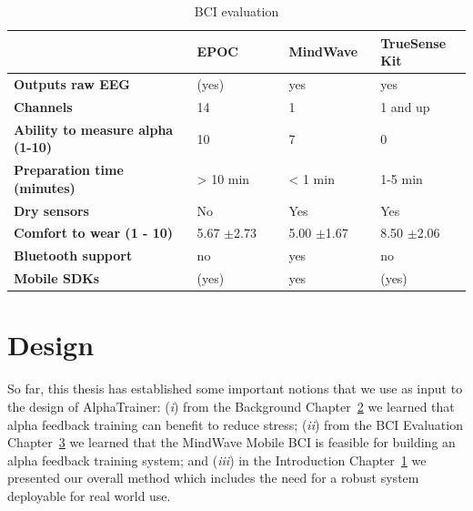 \documentclass[a4paper,10pt,english,lof,lot,twoside]{puthesis}
\begin{document}
\begin{table}
\capstart
\begin{center}

\bodyspacing

\begin{tabular}{>{\raggedright\arraybackslash}p{0.40\linewidth} p{0.20\linewidth} p{0.20\linewidth} p{0.20\linewidth}}

\toprule
\textsf{\relax } & \textsf{\relax 
EPOC
} & \textsf{\relax 
MindWave
} & \textsf{\relax 
TrueSense Kit
}\\
\hline\midrule

\textbf{Outputs raw EEG}
 & 
(yes)
 & 
yes
 & 
yes
\\

\textbf{Channels}
 & 
14
 & 
1
 & 
1 and up
\\

\textbf{Ability to measure alpha
(1-10)}
 & 
10
 & 
7
 & 
0
\\

\textbf{Preparation time
(minutes)}
 & 
\textgreater{} 10 min
 & 
\textless{} 1 min
 & 
1-5 min
\\

\textbf{Dry sensors}
 & 
No
 & 
Yes
 & 
Yes
\\

\textbf{Comfort to wear (1 - 10)}
 & 
5.67 \(\pm\)2.73
 & 
5.00 \(\pm\)1.67
 & 
8.50 \(\pm\)2.06
\\

\textbf{Bluetooth support}
 & 
no
 & 
yes
 & 
no
\\

\textbf{Mobile SDKs}
 & 
(yes)
 & 
yes
 & 
(yes)
\\
\hline\bottomrule

\end{tabular}
\caption[BCI evaluation]{BCI evaluation}\label{ch-experiment/index:table-bci-evaluation}
\end{center}
\end{table}


\chapter{Design}
\label{ch-design/index:design}\label{ch-design/index::doc}\label{ch-design/index:ch-design}
So far, this thesis has established some important notions that we use as input
to the design of AlphaTrainer: (\emph{i}) from the Background Chapter {\hyperref[ch-background/index:ch-background]{2}} we learned that alpha feedback training can benefit to
reduce stress; (\emph{ii}) from the BCI Evaluation Chapter {\hyperref[ch-experiment/index:ch-experiment]{3}} we learned that the MindWave Mobile BCI is feasible for
building an alpha feedback training system; and (\emph{iii}) in the Introduction
Chapter {\hyperref[ch-intro/index:ch-intro]{1}} we presented our overall method which includes
the need for a robust system deployable for real world use.
\end{document}

